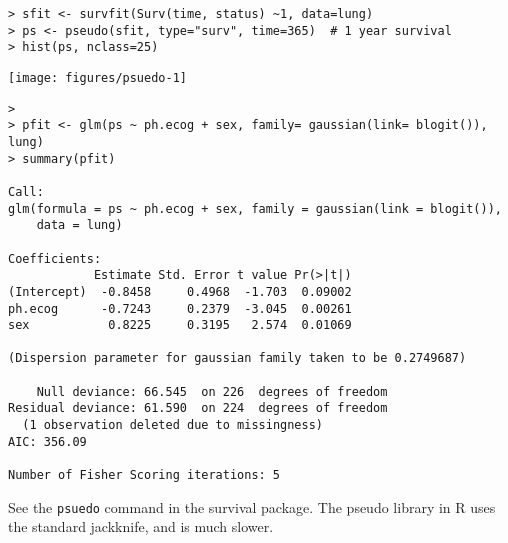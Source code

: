 \documentclass{article}\usepackage[]{graphicx}\usepackage[]{xcolor}
\makeatletter
\def\maxwidth{ %
  \ifdim\Gin@nat@width>\linewidth
    \linewidth
  \else
    \Gin@nat@width
  \fi
}
\newenvironment{kframe}{%
 \def\at@end@of@kframe{}%
 \ifinner\ifhmode%
  \def\at@end@of@kframe{\end{minipage}}%
  \begin{minipage}{\columnwidth}%
 \fi\fi%
 \def\FrameCommand##1{\hskip\@totalleftmargin \hskip-\fboxsep
 \colorbox{shadecolor}{##1}\hskip-\fboxsep
     \hskip-\linewidth \hskip-\@totalleftmargin \hskip\columnwidth}%
 \MakeFramed {\advance\hsize-\width
   \@totalleftmargin\z@ \linewidth\hsize
   \@setminipage}}%
 {\par\unskip\endMakeFramed%
 \at@end@of@kframe}
\newenvironment{knitrout}{}{} %
\newcommand{\code}[1]{\texttt{#1}}
\makeatother
\begin{document}
\begin{knitrout}
\color{fgcolor}\begin{kframe}
\begin{verbatim}
> sfit <- survfit(Surv(time, status) ~1, data=lung)
> ps <- pseudo(sfit, type="surv", time=365)  # 1 year survival
> hist(ps, nclass=25)
\end{verbatim}
\end{kframe}
\texttt{[image: figures/psuedo-1]} 
\begin{kframe}\begin{verbatim}
> 
> pfit <- glm(ps ~ ph.ecog + sex, family= gaussian(link= blogit()), lung)
> summary(pfit)

Call:
glm(formula = ps ~ ph.ecog + sex, family = gaussian(link = blogit()), 
    data = lung)

Coefficients:
            Estimate Std. Error t value Pr(>|t|)
(Intercept)  -0.8458     0.4968  -1.703  0.09002
ph.ecog      -0.7243     0.2379  -3.045  0.00261
sex           0.8225     0.3195   2.574  0.01069

(Dispersion parameter for gaussian family taken to be 0.2749687)

    Null deviance: 66.545  on 226  degrees of freedom
Residual deviance: 61.590  on 224  degrees of freedom
  (1 observation deleted due to missingness)
AIC: 356.09

Number of Fisher Scoring iterations: 5
\end{verbatim}
\end{kframe}
\end{knitrout}

See the \code{psuedo} command in the survival package.
The pseudo library in R uses the standard jackknife, and is much slower.
\end{document}
